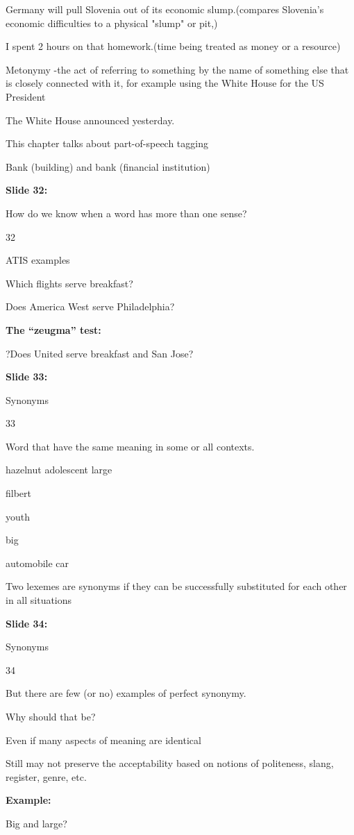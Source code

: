 \documentclass[11pt,a4paper]{article}
\begin{document}
Germany will pull Slovenia out of its economic slump.(compares Slovenia's economic difficulties to a physical "slump" or pit,)

I spent 2 hours on that homework.(time being treated as money or a resource)

Metonymy	-the act of referring to something by the name of  something else that is closely connected with it, for example using  the White House for the US President

The White House announced yesterday.

This chapter talks about part-of-speech tagging

Bank (building) and bank (financial institution)

\textbf{Slide 32:}

How do we know when a word has  more than one sense?

32

ATIS examples

Which flights serve breakfast?

Does America West serve Philadelphia?

\textbf{The “zeugma” test:} 

?Does United serve breakfast and San Jose?

\textbf{Slide 33:}

Synonyms

33

Word that have the same meaning in some or all contexts.

hazelnut  adolescent  large

filbert

youth

big

automobile car

Two lexemes are synonyms if they can be successfully substituted for  each other in all situations

\textbf{Slide 34:}

Synonyms

34

But there are few (or no) examples of perfect synonymy.

Why should that be?

Even if many aspects of meaning are identical

Still may not preserve the acceptability based on notions of politeness, slang,  register, genre, etc.

\textbf{Example:} 

Big and large?
\end{document}

